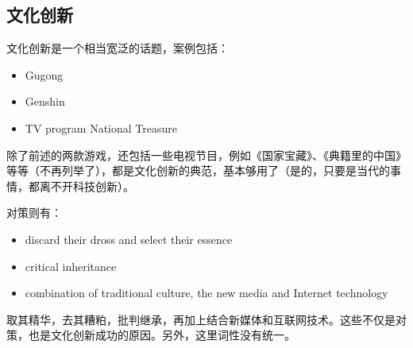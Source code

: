 \subsection{文化创新}
文化创新是一个相当宽泛的话题，案例包括：
\begin{itemize}
    \item Gugong
    \item Genshin
    \item TV program National Treasure
\end{itemize}
\par
除了前述的两款游戏，还包括一些电视节目，例如《国家宝藏》、《典籍里的中国》等等（不再列举了），都是文化创新的典范，基本够用了（是的，只要是当代的事情，都离不开科技创新）。
\par
对策则有：
\begin{itemize}
    \item discard their dross and select their essence 
    \item critical inheritance
    \item combination of traditional culture, the new media and Internet technology
\end{itemize}
\par
取其精华，去其糟粕，批判继承，再加上结合新媒体和互联网技术。这些不仅是对策，也是文化创新成功的原因。另外，这里词性没有统一。